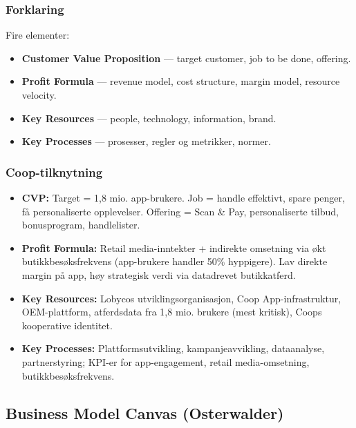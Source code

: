 \subsubsection*{Forklaring}
Fire elementer:
\begin{itemize}
  \item \textbf{Customer Value Proposition} --- target customer, job to
    be done, offering.
  \item \textbf{Profit Formula} --- revenue model, cost structure,
    margin model, resource velocity.
  \item \textbf{Key Resources} --- people, technology, information, brand.
  \item \textbf{Key Processes} --- prosesser, regler og metrikker, normer.
\end{itemize}

\subsubsection*{Coop-tilknytning}
\begin{itemize}
  \item \textbf{CVP:} Target = 1,8 mio. app-brukere. Job = handle
    effektivt, spare penger, få personaliserte opplevelser. Offering =
    Scan \& Pay, personaliserte tilbud, bonusprogram, handlelister.
  \item \textbf{Profit Formula:} Retail media-inntekter + indirekte
    omsetning via økt butikkbesøksfrekvens (app-brukere handler 50\%
    hyppigere). Lav direkte margin på app, høy strategisk verdi via
    datadrevet butikkatferd.
  \item \textbf{Key Resources:} Lobycos utviklingsorganisasjon,
    Coop App-infrastruktur, OEM-plattform, atferdsdata fra 1,8 mio.
    brukere (mest kritisk), Coops kooperative identitet.
  \item \textbf{Key Processes:} Plattformsutvikling, kampanjeavvikling,
    dataanalyse, partnerstyring; KPI-er for app-engagement, retail
    media-omsetning, butikkbesøksfrekvens.
\end{itemize}

\subsection{Business Model Canvas (Osterwalder)}
\label{model:bmc}

